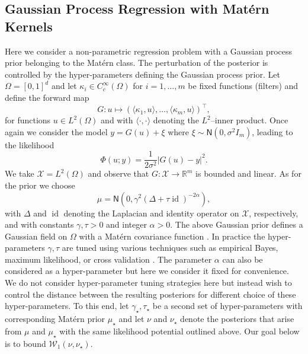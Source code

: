 \documentclass[final]{siamart171218}
\newcommand{\fh}[1]{{\color{blue} #1}}
\newcommand{\mcl}{\mathcal}
\newcommand{\mbb}{\mathbb}
\newcommand{\R}{\mbb{R}}
\newcommand{\mX}{\mcl{X}}
\DeclareMathOperator*{\Id}{id}
\newcommand{\W}{\mathcal{W}}
\newcommand{\N}{\mathsf{N}}
\begin{document}
\subsection{Gaussian Process Regression with Mat\'ern Kernels}\label{sec:matern-prior}
Here we consider a non-parametric regression problem with a Gaussian process 
prior belonging to the Mat\'ern class. The perturbation of 
the posterior is controlled by the hyper-parameters defining the Gaussian process prior.  Let
$\Omega = [0,1]^d$ and let $\kappa_i \in C^\infty_c(\Omega)$ for $i=1, \dots, m$ be fixed functions (filters)  and define the forward map
\begin{equation*}
	G: u \mapsto \left( \langle \kappa_1, u \rangle, \dots, \langle \kappa_m, u \rangle \right)^\top,
\end{equation*}
for  functions $u \in L^2(\Omega)$ and with $\langle \cdot, \cdot \rangle$ denoting the 
$L^2$--inner product.
 Once again we consider the model $y = G(u) + \xi$ 
 where $\xi \sim \N(0, \sigma^2 I_m)$,
leading to the likelihood 
\begin{equation*}
  \Phi(u;y) = \frac{1}{2\sigma^2} | G(u) - y |^2.
\end{equation*}
We take $\mX = L^2(\Omega)$ and observe that 
$G: \mX \to \R^m$ is bounded and linear.
 As for the prior we choose 
\begin{equation*}
  \mu = \N( 0,  \gamma^2(\Delta + \tau\Id)^{-2\alpha} ),
\end{equation*}
with $\Delta$ and $\Id$ denoting the Laplacian and identity operator on $\mX$, respectively, and with constants $\gamma, \tau >0$
and integer $\alpha >0$. The above Gaussian prior defines a Gaussian field 
on $\Omega$ with a Mat\'ern covariance function \cite{whittle1963stochastic}.
In practice the hyper-parameters $\gamma, \tau$ are tuned using 
various techniques such as empirical Bayes, maximum likelihood, 
or cross validation \cite{williams2006gaussian}. The parameter $\alpha$ can also be considered 
as a hyper-parameter but here we consider it  fixed for convenience.
We do not consider hyper-parameter tuning strategies here but instead wish to 
control the distance between the resulting posteriors for different 
choice of these hyper-parameters. 
To this end, 
let $\gamma_\star, \tau_\star$ be a second set of hyper-parameters 
with corresponding Mat\'ern prior $\mu_\star$ and let $\nu$ and $\nu_\star$ 
denote the  posteriors that arise from $\mu$ and $\mu_\star$
with the same likelihood potential outlined above. Our goal below is to bound $\W_1(\nu, \nu_\star)$.
\end{document}
